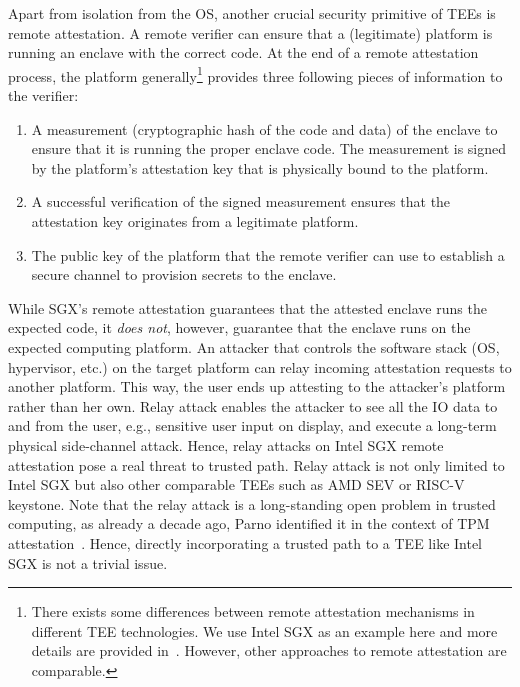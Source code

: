 Apart from isolation from the OS, another crucial security primitive of TEEs is remote attestation. A remote verifier can ensure that a (legitimate) platform is running an enclave with the correct code. At the end of a remote attestation process, the platform generally\footnote{There exists some differences between remote attestation mechanisms in different TEE technologies. We use Intel SGX as an example here and more details are provided in~. However, other approaches to remote attestation are comparable.} provides three following pieces of information to the verifier: 
\begin {enumerate}
\item A measurement (cryptographic hash of the code and data) of the enclave to ensure that it is running the proper enclave code. The measurement is signed by the platform's attestation key that is physically bound to the platform. 
\item A successful verification of the signed measurement ensures that the attestation key originates from a legitimate platform.
\item The public key of the platform that the remote verifier can use to establish a secure channel to provision secrets to the enclave.
\end{enumerate}

 While SGX's remote attestation guarantees that the attested enclave runs the expected code, it \emph{does not}, however, guarantee that the enclave runs on the expected computing platform. An attacker that controls the software stack (OS, hypervisor, etc.) on the target platform can relay incoming attestation requests to another platform. This way, the user ends up attesting to the attacker's platform rather than her own. Relay attack enables the attacker to see all the IO data to and from the user, e.g., sensitive user input on display, and execute a long-term physical side-channel attack. Hence, relay attacks on Intel SGX remote attestation pose a real threat to trusted path. Relay attack is not only limited to Intel SGX but also other comparable TEEs such as AMD SEV or RISC-V keystone. Note that the relay attack is a long-standing open problem in trusted computing, as already a decade ago, Parno identified it in the context of TPM attestation~\cite{parno2008bootstrapping}. Hence, directly incorporating a trusted path to a TEE like Intel SGX is not a trivial issue.


